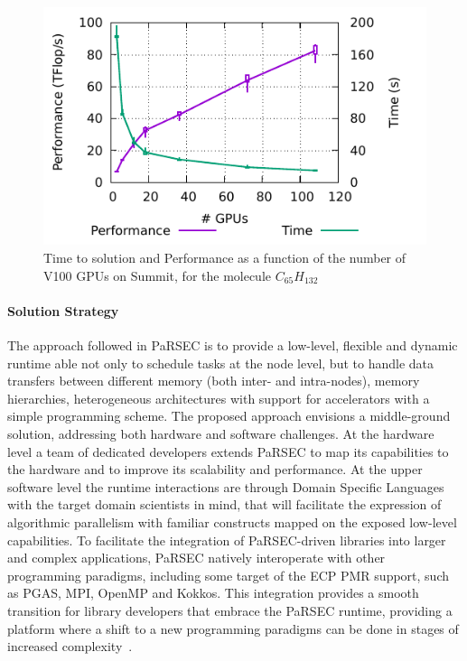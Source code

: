 \begin{figure}
\centering\includegraphics[width=.9\linewidth]{projects/2.3.1-PMR/2.3.1.09-ParSEC/irr-bs-gemm-combined.pdf}
\caption{Time to solution and Performance as a function of the number
  of V100 GPUs on Summit, for the molecule
  $C_{65}H_{132}$\label{fig:irrbsgemm}}
\end{figure}\paragraph{Solution Strategy}
The approach followed in PaRSEC is to provide a low-level, flexible and dynamic
runtime able not only to schedule tasks at the node level, but to handle data
transfers between different memory (both inter- and intra-nodes), memory
hierarchies, heterogeneous architectures with support for accelerators with a
simple programming scheme. The proposed approach envisions a middle-ground
solution, addressing both hardware and software challenges. At the hardware
level a team of dedicated developers extends PaRSEC to map its capabilities to
the hardware and to improve its scalability and performance. At the upper
software level the runtime interactions are through Domain Specific Languages
with the target domain scientists in mind, that will facilitate the expression
of algorithmic parallelism with familiar constructs mapped on the exposed
low-level capabilities. To facilitate the integration of PaRSEC-driven libraries
into larger and complex applications, PaRSEC natively interoperate with other
programming paradigms, including some target of the ECP PMR support, such as
PGAS, MPI, OpenMP and Kokkos. This integration provides a smooth transition for
library developers that embrace the PaRSEC runtime, providing a platform where a
shift to a new programming paradigms can be done in stages of increased
complexity~\cite{lorapo-protools,BLR_LU,parsec_pdgemm}.


